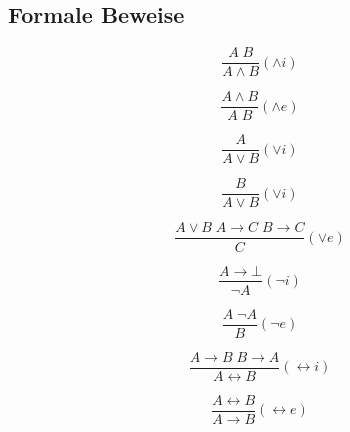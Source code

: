 \documentclass[11pt, a4paper,twocolumn]{scrartcl}
\begin{document}
\subsection{Formale Beweise}
\begin{minipage}{3.8cm}\begin{displaymath}\frac{A \; B}{A \land B}(\land i)\end{displaymath}\end{minipage}
\begin{minipage}{3.8cm}\begin{displaymath}\frac{A \land B}{A \; B}(\land e)\end{displaymath}\end{minipage}
\begin{minipage}{3.8cm}\begin{displaymath}\frac{A}{A \lor B}(\lor i)\end{displaymath}\end{minipage}
\begin{minipage}{3.8cm}\begin{displaymath}\frac{B}{A \lor B}(\lor i)\end{displaymath}\end{minipage}
\begin{minipage}{7.6cm}\begin{displaymath}\frac{A \lor B \; A \rightarrow C \; B \rightarrow C}{C}(\lor e)\end{displaymath}\end{minipage}
\begin{minipage}{3.8cm}\begin{displaymath}\frac{A \rightarrow \bot}{\lnot A}(\lnot i)\end{displaymath}\end{minipage}
\begin{minipage}{3.8cm}\begin{displaymath}\frac{A \; \lnot A}{B}(\lnot e)\end{displaymath}\end{minipage}
\begin{minipage}{7.6cm}
\begin{displaymath}\frac{A \rightarrow B \; B \rightarrow A}{A \leftrightarrow B}(\leftrightarrow i)\end{displaymath}
\end{minipage}
\begin{minipage}{3.8cm}
\begin{displaymath}\frac{A \leftrightarrow B}{A \rightarrow B}(\leftrightarrow e)\end{displaymath}
\end{minipage}
\end{document}
